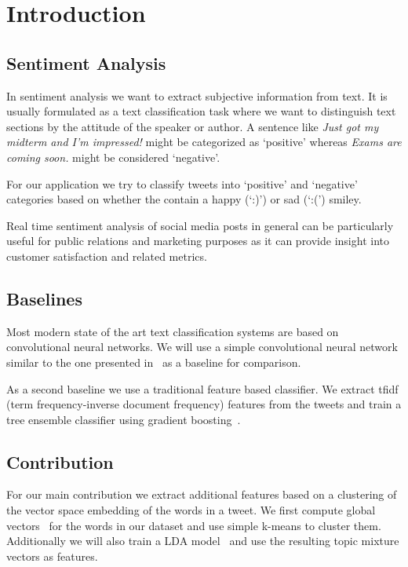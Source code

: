 
\section{Introduction}

\subsection{Sentiment Analysis}

In sentiment analysis we want to extract subjective information from text. It is
usually formulated as a text classification task where we want to distinguish
text sections by the attitude of the speaker or author. A sentence like
\textit{Just got my midterm and I'm impressed!} might be categorized as `positive'
whereas \textit{Exams are coming soon.} might be considered `negative'.

For our application we try to classify tweets into `positive' and `negative'
categories based on whether the contain a happy (`:)') or sad (`:(') smiley.

Real time sentiment analysis of social media posts in general can be particularly
useful for public relations and marketing purposes as it can provide insight into
customer satisfaction and related metrics.

\subsection{Baselines}

Most modern state of the art text classification systems are based on convolutional
neural networks. We will use a simple convolutional neural network similar to
the one presented in~\cite{cnn14} as a baseline for comparison.

As a second baseline we use a traditional feature based classifier. We extract
tfidf (term frequency-inverse document frequency) features from the tweets
and train a tree ensemble classifier using gradient boosting~\cite{gradBoost}.

\subsection{Contribution}

For our main contribution we extract additional features based on a clustering
of the vector space embedding of the words in a tweet. We first compute global
vectors~\cite{glove} for the words in our dataset and use simple k-means to cluster them.  
Additionally we will also train a LDA model~\cite{LDA} and use the resulting
topic mixture vectors as features.
